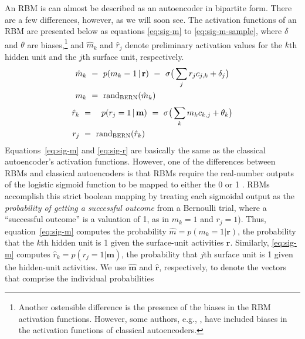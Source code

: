 An RBM is can almost be described as an autoencoder in bipartite form. There are a few differences, however, as we will soon see.
The activation functions of an RBM are presented below as equations \eqref{eq:sig-m} to \eqref{eq:sig-m-sample}, where $\delta$ and $\theta$ are biases,\footnote{Another ostensible difference 
is the presence of the biases in the 
RBM activation functions. However, some authors, e.g., \citet{rudy-and-taylor:2014}, have included biases in the activation functions of classical autoencoders.} and $\hat{m}_k$ and $\hat{r}_j$ denote preliminary activation values for the $k$th hidden unit and the $j$th surface unit, respectively.
\begin{align}
\label{eq:sig-m}
\hat{m}_k \,\, &= \,\, p(m_{k}=1 \, | \, \mathbf{r}) \,\, = \,\, \sigma\big(\sum_{j} r_{j} c_{j,k} + \delta_{j}\big) \\
\label{eq:sig-m-sample}
m_{k}\,\, &= \,\, \text{rand}_{\textsc{BERN}}(\hat{m}_k)
\end{align}
\begin{align}
\label{eq:sig-r}
\hat{r}_k \,\, &= \quad p(r_{j}=1 \, | \, \mathbf{m}) \,\, =  \,\, \sigma\big(\sum_{k}  m_{k} c_{k,j} + \theta_{k}\big) \\
\label{eq:sig-r-sample}
r_{j} \,\, &= \,\, \text{rand}_{\textsc{BERN}}(\hat{r}_k)
\end{align}
Equations~\eqref{eq:sig-m} and \eqref{eq:sig-r} are basically the same as the classical autoencoder's activation functions. 
However, one of the differences between RBMs and  classical autoencoders is that RBMs require the real-number outputs of the logistic sigmoid function to be mapped to either the 0 or 1 \citep{hinton:2012}.
RBMs accomplish this strict boolean mapping by treating each sigmoidal output as  the \emph{probability of getting a successful outcome} from a Bernoulli trial, where a ``successful outcome'' is a valuation of 1, as in $m_k = 1$ and $r_j = 1$). Thus, equation~\eqref{eq:sig-m} computes the probability $\hat{m} = p(m_{k}=1|\mathbf{r})$, the probability that the $k$th hidden unit is 1 given the surface-unit activities $\mathbf{r}$. Similarly, \eqref{eq:sig-m} computes $\hat{r}_k = p(r_{j}=1|\mathbf{m})$, the probability that $j$th surface unit is 1 given the hidden-unit activities. We use $\hat{\mathbf{m}}$ and $\hat{\mathbf{r}}$, respectively, to denote the vectors that comprise the individual probabilities
